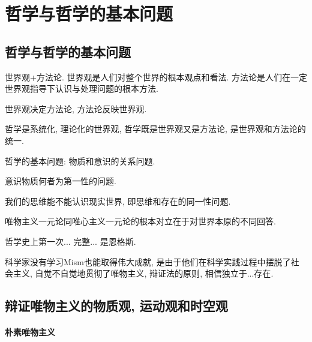 \documentclass{ctexart}
\begin{document}

\section{哲学与哲学的基本问题} %
\label{sec:哲学与哲学的基本问题}

\subsection{哲学与哲学的基本问题} %
\label{sub:哲学与哲学的基本问题}

世界观+方法论. 世界观是人们对整个世界的根本观点和看法. 方法论是人们在一定世界观指导下认识与处理问题的根本方法.
\begin{finale}
    世界观决定方法论, 方法论反映世界观.
\end{finale}
哲学是系统化, 理论化的世界观, 哲学既是世界观又是方法论, 是世界观和方法论的统一.
\par
哲学的基本问题: 物质和意识的关系问题.
\begin{cenum}
    \item 意识物质何者为第一性的问题.
    \item 我们的思维能不能认识现实世界, 即思维和存在的同一性问题.
\end{cenum}
\begin{sample}
    \begin{ex}
        唯物主义一元论同唯心主义一元论的根本对立在于{\color{red}对世界本原的不同回答}.
    \end{ex}
    \begin{ex}
        哲学史上第一次... 完整... 是恩格斯.
    \end{ex}
    \begin{ex}
        科学家没有学习Mism也能取得伟大成就, 是由于他们{\color{red}在科学实践过程中摆脱了社会主义}, {\color{red}自觉不自觉地贯彻了唯物主义, 辩证法的原则}, {\color{red}相信独立于...存在}.
    \end{ex}
\end{sample}


\subsection{辩证唯物主义的物质观, 运动观和时空观} %
\label{sub:辩证唯物主义的物质观_运动观和时空观}

\paragraph{朴素唯物主义} %
\label{par:朴素唯物主义}
\end{document}
